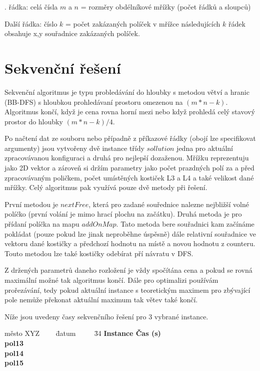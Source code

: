 \documentclass[epsf,epic,eepic,eepicemu]{article}
\begin{document}
. řádka: celá čísla $m$ a $n$ = rozměry obdélníkové mřížky (počet řádků a sloupců)

\noindent
Další řádka: číslo $k$ = počet zakázaných políček v mřížce
následujících $k$ řádek obsahuje x,y souřadnice zakázaných políček.

\section{Sekvenční řešení}
Sekvenční algoritmus je typu probledávání do hloubky s metodou větví a hranic (BB-DFS) s hloubkou prohledávaní prostoru omezenou na $(m*n-k)$.
Algoritmus končí, když je cena rovna horní mezi nebo když prohledá celý stavový prostor do hloubky $(m*n-k)/4$.

Po načtení dat ze souboru nebo případně z příkazové řádky (obojí lze specifikovat argumenty) jsou vytvořeny dvě instance třídy $sollution$ jedna pro aktuální zpracovávanou konfiguraci a druhá pro nejlepší dozaženou. Mřížku reprezentuju jako 2D vektor a zároveň si držím parametry jako počet prazdných polí za a před zpracovávaným poličkem, počet umístěných kostiček L3 a L4 a také velikost dané mřížky. Celý algoritmus pak využívá pouze dvě metody při řešení. 

První metodou je $nextFree$, která pro zadané souřednice nalezne nejbližší volné políčko (první volání je mimo hrací plochu na začátku). Druhá metoda je pro přídaní políčka na mapu $addOnMap$. Tato metoda bere souřadnici kam začínáme pokládat (pouze pokud lze jinak neproběhne úspěsně) dále relativní souřadnice ve vektoru dané kostičky a předchozí hodnotu na místě a novou hodnotu z counteru. Touto metodou lze také kostičky odebírat pří návratu v DFS. 

Z držených parametrů daneho rozložení je vždy spočítána cena a pokud se rovná maximální možné tak algoritmus končí. Dále pro optimalizi používám prořezávání, tedy pokud aktuální instance s teoretickým maximem pro zbývající pole nemůže překonat aktuální maximum tak větev také končí.

Níže jsou uvedeny časy sekvenčního řešení pro 3 vybrané instance.

\begin{center}
\parbox{0cm}{\begin{tabbing}
 město XYZ ~~~~\= datum ~~~~
    \= 34 \kill
    \bfseries Instance \>
    \bfseries Čas (s) \>
    \\[2mm]
    pol13  \>  \\
    pol14  \> \\
    pol15  \> 
\end{tabbing}}
\end{center}
\end{document}
